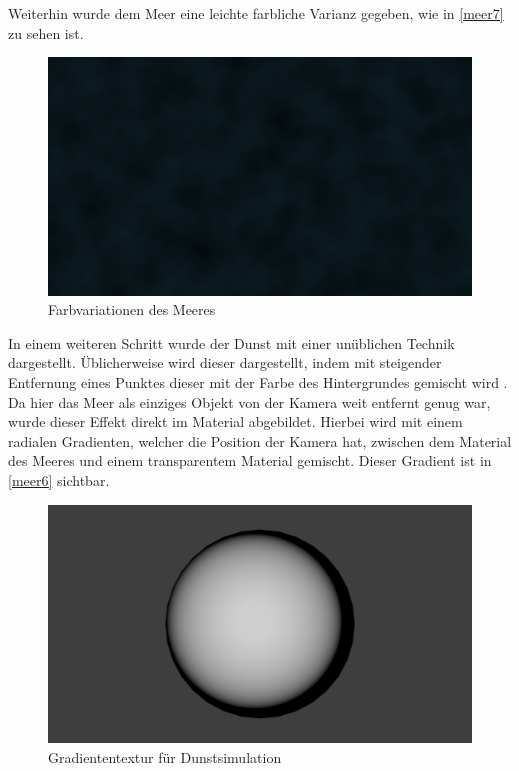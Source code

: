 Weiterhin wurde dem Meer eine leichte farbliche Varianz gegeben, wie in \autoref{meer7} zu sehen ist.

\begin{figure}[H]
\includegraphics[width=\textwidth]{gfx/prod/ocean/meer7.jpg}
\caption{Farbvariationen des Meeres}
\label{meer7}
\end{figure}

In einem weiteren Schritt wurde der Dunst mit einer unüblichen Technik dargestellt. Üblicherweise wird dieser dargestellt, indem mit steigender Entfernung eines Punktes dieser mit der Farbe des Hintergrundes gemischt wird \cite{mist}.\\
Da hier das Meer als einziges Objekt von der Kamera weit entfernt genug war, wurde dieser Effekt direkt im Material abgebildet. Hierbei wird mit einem radialen Gradienten, welcher die Position der Kamera hat, zwischen dem Material des Meeres und einem transparentem Material gemischt. Dieser Gradient ist in \autoref{meer6} sichtbar.

\begin{figure}[H]
\includegraphics[width=\textwidth]{gfx/prod/ocean/meer6.jpg}
\caption{Gradiententextur für Dunstsimulation}
\label{meer6}
\end{figure}

